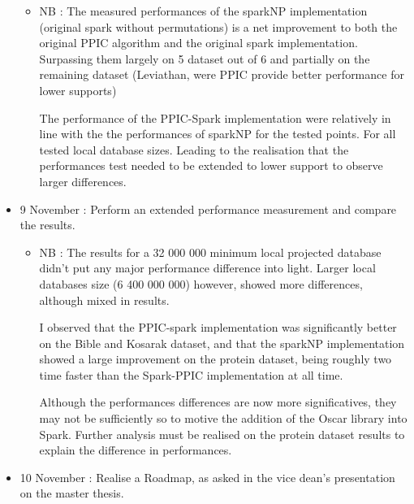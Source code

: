 \documentclass[10pt]{article}
\begin{document}
\begin{itemize}
\begin{itemize}

\item NB : The measured performances of the sparkNP implementation (original spark without permutations) is a net improvement to both the original PPIC algorithm and the original spark implementation.
Surpassing them largely on 5 dataset out of 6 and partially on the remaining dataset (Leviathan, were PPIC provide better performance for lower supports)\newline

 The performance of the PPIC-Spark implementation were relatively in line with the the performances of sparkNP for the tested points. For all tested local database sizes.
 Leading to the realisation that the performances test needed to be extended to lower support to observe larger differences.

\end{itemize}

\item 9 November : Perform an extended performance measurement and compare the results.

\begin{itemize}

\item NB : The results for a 32 000 000 minimum local projected database didn't put any major performance difference into light. 
Larger local databases size (6 400 000 000) however, showed more differences, although mixed in results.
\newline

I observed that the PPIC-spark implementation was significantly better on the Bible and Kosarak dataset, and
that the sparkNP implementation showed a large improvement on the protein dataset, being roughly two time faster than the Spark-PPIC implementation at all time. \newline

Although the performances differences are now more significatives, they may not be sufficiently so to motive the addition of the Oscar library into Spark. 
Further analysis must be realised on the protein dataset results to explain the difference in performances.

\end{itemize}

\item 10 November : Realise a Roadmap, as asked in the vice dean's presentation on the master thesis.
\end{itemize}
\end{document}
